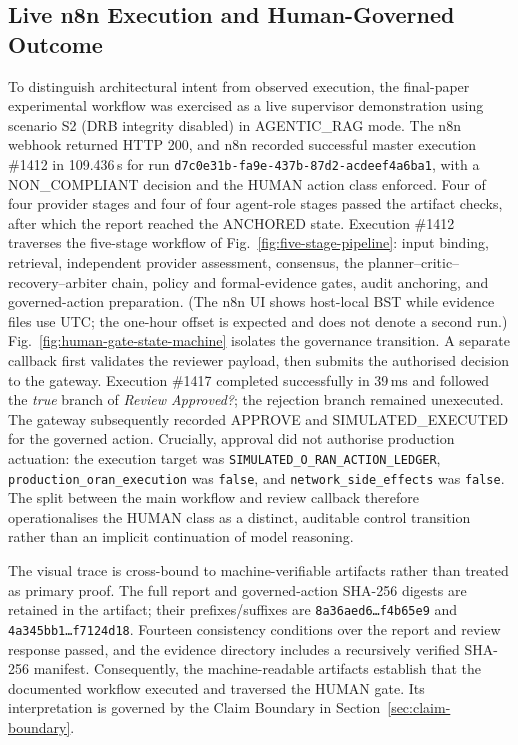 \documentclass[journal]{IEEEtran}
\newif\ifshowrevisions
\newcommand{\rev}[1]{{\ifshowrevisions\color{blue}\else\color{black}\fi #1}}
\begin{document}
\subsection{Live n8n Execution and Human-Governed Outcome}
\label{sec:live-run}
To distinguish architectural intent from observed execution, the final-paper
\rev{experimental} workflow was exercised as a live supervisor demonstration using
scenario S2 (DRB integrity disabled) in AGENTIC\_RAG mode. The \rev{n8n}
webhook returned HTTP 200, and n8n recorded successful master execution
\#1412 in 109.436\,s for run
\texttt{d7c0e31b-fa9e-437b-87d2-acdeef4a6ba1}, with a NON\_COMPLIANT
decision and the HUMAN action class enforced. Four of four provider stages
and four of four agent-role stages passed the artifact checks, after which
the report reached the ANCHORED state. Execution \#1412 traverses the
five-stage workflow of Fig.~\ref{fig:five-stage-pipeline}: input binding,
retrieval, independent provider assessment, consensus, the
planner--critic--recovery--arbiter chain, policy and formal-evidence gates,
audit anchoring, and governed-action preparation. (The n8n UI shows
host-local BST while evidence files use UTC; the one-hour offset is expected
and does not denote a second run.)
Fig.~\ref{fig:human-gate-state-machine} isolates the governance transition. A
separate callback first validates the reviewer payload, then submits the
authorised decision to the gateway. Execution \#1417 completed successfully in
39\,ms and followed the \emph{true} branch of \emph{Review Approved?}; the
rejection branch remained unexecuted. The gateway subsequently recorded
APPROVE and SIMULATED\_EXECUTED for the governed action. Crucially, approval
did not authorise production actuation: the execution target was
\texttt{SIMULATED\_O\_RAN\_ACTION\_LEDGER},
\texttt{production\_oran\_execution} was \texttt{false}, and
\texttt{network\_side\_effects} was \texttt{false}. The split between the main
workflow and review callback therefore operationalises the HUMAN class as a
distinct, auditable control transition rather than an implicit continuation of
model reasoning.

The visual trace is cross-bound to machine-verifiable artifacts rather than
treated as primary proof. The full report and governed-action SHA-256 digests
are retained in the artifact; their prefixes/suffixes are
\texttt{8a36aed6\ldots f4b65e9} and \texttt{4a345bb1\ldots f7124d18}.
Fourteen consistency conditions over the report and review response passed,
and the evidence directory includes a recursively verified SHA-256 manifest.
Consequently, the machine-readable artifacts establish that the documented
workflow executed and traversed the HUMAN gate. Its interpretation is governed
by the Claim Boundary in Section~\ref{sec:claim-boundary}.
\end{document}
